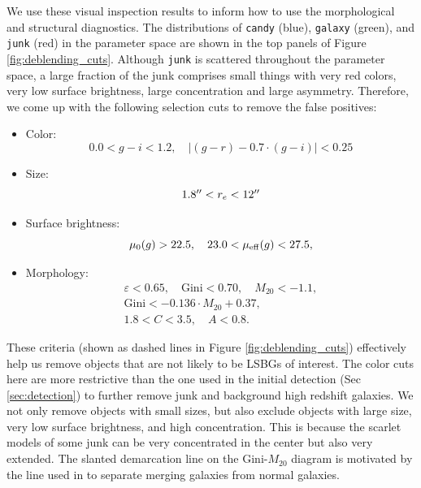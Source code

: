 \documentclass[twocolumn,astrosymb,twocolappendix]{aastex631}
\newcommand{\code}[1]{\texttt{#1}}
\begin{document}
\begin{CJK*}{UTF8}{gbsn}
We use these visual inspection results to inform how to use the morphological and structural diagnostics. The distributions of \code{candy} (blue), \code{galaxy} (green), and \code{junk} (red) in the parameter space are shown in the top panels of Figure \ref{fig:deblending_cuts}. Although \code{junk} is scattered throughout the parameter space, a large fraction of the junk comprises small things with very red colors, very low surface brightness, large concentration and large asymmetry. Therefore, we come up with the following selection cuts to remove the false positives:
\begin{itemize}
    \item Color:
    \[0.0 < g-i < 1.2,\quad |(g-r) - 0.7\cdot (g-i)| < 0.25\]
    \item Size: \[1.8 \mbox{$^{\prime\prime}$} < r_e < 12 \mbox{$^{\prime\prime}$}\]
    \item Surface brightness: \[\mu_0(g) > 22.5,\quad 23.0 < \mu_{\rm eff}(g) < 27.5,\]
    \item Morphology: 
    \begin{gather*}
        \varepsilon < 0.65,\quad \mathrm{Gini} < 0.70,\quad M_{20} < -1.1,\\
        \mathrm{Gini} < -0.136\cdot M_{20} + 0.37,\\
        1.8 < C < 3.5,\quad A < 0.8.
    \end{gather*}
\end{itemize}
These criteria (shown as dashed lines in Figure \ref{fig:deblending_cuts}) effectively help us remove objects that are not likely to be LSBGs of interest. The color cuts here are more restrictive than the one used in the initial detection (Sec \ref{sec:detection}) to further remove junk and background high redshift galaxies. We not only remove objects with small sizes, but also exclude objects with large size, very low surface brightness, and high concentration. This is because the scarlet models of some junk can be very concentrated in the center but also very extended. The slanted demarcation line on the Gini-$M_{20}$ diagram is motivated by the line used in \citet{Lotz2008} to separate merging galaxies from normal galaxies. 


\end{CJK*}
\end{document}
